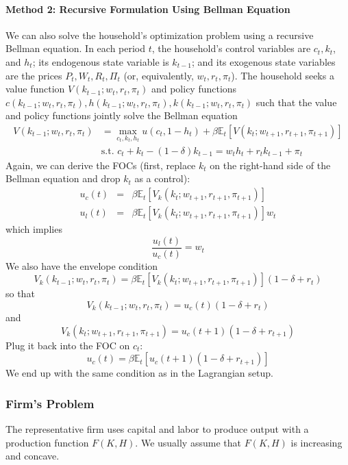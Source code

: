 \documentclass[12pt]{article}
\begin{document}
\paragraph{Method 2: Recursive Formulation Using Bellman Equation \\ [6pt]} We can also solve the household's optimization problem using a recursive Bellman equation. In each period $t$, the household's control variables are $c_t, k_t$, and $h_t$; its endogenous state variable is $k_{t-1}$; and its exogenous state variables are the prices $P_t, W_t, R_t, \Pi_t$ (or, equivalently, $w_t, r_t, \pi_t$). The household seeks a value function $V(k_{t-1}; w_t, r_t, \pi_t)$ and policy functions $c(k_{t-1}; w_t, r_t, \pi_t), h(k_{t-1}; w_t, r_t, \pi_t), k(k_{t-1}; w_t, r_t, \pi_t)$ such that the value and policy functions jointly solve the Bellman equation
\begin{align}\label{eq:bellman}
	V(k_{t-1}; w_t, r_t, \pi_t) & = \max_{c_t, k_t, h_t} u(c_t, 1-h_t) + \beta \mathbb{E}_t \left[V(k_{t}; w_{t+1}, r_{t+1}, \pi_{t+1})\right] \nonumber \\
	& \text{s.t. } c_t + k_t - (1-\delta)k_{t-1} = w_t h_t + r_t k_{t-1} + \pi_t
\end{align}	
Again, we can derive the FOCs (first, replace $k_t$ on the right-hand side of the Bellman equation and drop $k_t$ as a control):
\begin{eqnarray}
	u_c(t) &=& \beta \mathbb{E}_t\left[V_k(k_{t}; w_{t+1}, r_{t+1}, \pi_{t+1})\right] \\
	u_l(t) &=& \beta \mathbb{E}_t\left[V_k(k_{t}; w_{t+1}, r_{t+1}, \pi_{t+1})\right] w_t 
\end{eqnarray}
which implies
\[\frac{u_l(t)}{u_c(t)} = w_t\]
We also have the envelope condition
\begin{equation}
	V_k(k_{t-1}; w_t, r_t, \pi_t) = \beta \mathbb{E}_t\left[V_k(k_{t}; w_{t+1}, r_{t+1}, \pi_{t+1})\right] (1-\delta + r_t)
\end{equation}
so that
\[V_k(k_{t-1}; w_t, r_t, \pi_t) =  u_c(t) (1-\delta + r_t)\]
and 
\[V_k(k_{t}; w_{t+1}, r_{t+1}, \pi_{t+1}) =  u_c(t+1) (1-\delta + r_{t+1})\]
Plug it back into the FOC on $c_t$:
\begin{equation}
	u_c(t) = \beta \mathbb{E}_t \left[u_c(t+1) (1-\delta + r_{t+1})\right]
\end{equation}
We end up with the same condition as in the Lagrangian setup.

\subsubsection{Firm's Problem} The representative firm uses capital and labor to produce output with a production function $F(K,H)$. We usually assume that $F(K,H)$ is increasing and concave. 
\end{document}

